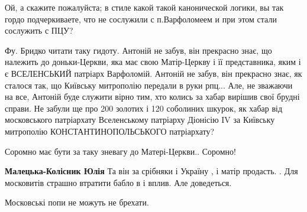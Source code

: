 \begin{itemize}
 

Ой, а скажите пожалуйста; в стиле какой такой канонической логики, вы так гордо
подчеркиваете, что не сослужили с п.Варфоломеем и при этом стали сослужить с
ПЦУ?


 

Фу. Бридко читати таку гидоту. Антоній не забув, він прекрасно знає, що
належить до доньки-Церкви, яка має свою Матір-Церкву і її представника, яким і
є ВСЕЛЕНСЬКИЙ патріарх Варфоломій. Антоній не забув, він прекрасно знає, як
сталося так, що Київську митрополію передали в руки рпц... Але, не зважаючи на
все, Антоній буде служити вірно тим, хто колись за хабар вирішив свої брудні
справи. Не забули ще про 200 золотих і 120 соболиних шкурок, як хабар від
московського патріархату Вселенському патріарху Діонісію IV за Київську
митрополію КОНСТАНТИНОПОЛЬСЬКОГО патріархату?

Соромно має бути за таку зневагу до Матері-Церкви.. Соромно!

\begin{itemize}
 
\textbf{Малецька-Колісник Юлія} Та він за срібняки і Україну , і матір продасть. . Для московитів страшно втратити бабло в і вплив. Але доведеться.
\end{itemize}

 
Московські попи не можуть не брехати.

 

\end{itemize}
